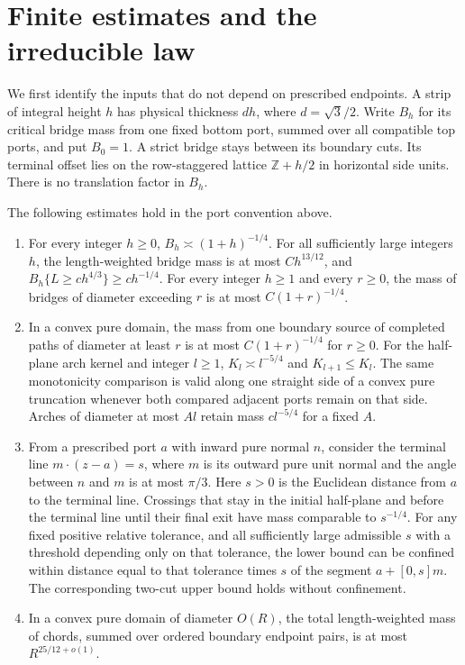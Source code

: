 \section{Finite estimates and the irreducible law}\label{c:inputs}
We first identify the inputs that do not depend on prescribed endpoints.
A strip of integral height $h$ has physical thickness $dh$, where
$d=\sqrt3/2$. Write $B_h$ for its critical bridge mass from one fixed
bottom port, summed over all compatible top ports, and put $B_0=1$.
A strict bridge stays between its boundary cuts. Its terminal offset lies
on the row-staggered lattice $\mathbb Z+h/2$ in horizontal side units.
There is no translation factor in $B_h$.

\begin{proposition}\label{c:finite}
The following estimates hold in the port convention above.
\begin{enumerate}
\item For every integer $h\ge0$, $B_h\asymp(1+h)^{-1/4}$.
For all sufficiently large integers $h$, the length-weighted
bridge mass is at most $Ch^{13/12}$, and
$B_h\{L\ge ch^{4/3}\}\ge ch^{-1/4}$.
For every integer $h\ge1$ and every $r\ge0$, the mass of
bridges of diameter exceeding $r$ is at most $C(1+r)^{-1/4}$.
\item In a convex pure domain, the mass from one boundary source of
completed paths of diameter at least $r$ is at most $C(1+r)^{-1/4}$
for $r\ge0$.
For the half-plane arch kernel and integer $l\ge1$,
$K_l\asymp l^{-5/4}$ and $K_{l+1}\le K_l$.
The same monotonicity comparison is valid along one straight side
of a convex pure truncation whenever both compared adjacent ports
remain on that side. Arches of diameter at most
$Al$ retain mass $cl^{-5/4}$ for a fixed $A$.
\item From a prescribed port $a$ with inward pure normal $n$, consider
the terminal line $m\cdot(z-a)=s$, where $m$ is its outward pure unit
normal and the angle between $n$ and $m$ is at most $\pi/3$.
Here $s>0$ is the Euclidean distance from $a$ to the terminal line.
Crossings that stay in the initial half-plane and before the terminal
line until their final exit have mass comparable to $s^{-1/4}$.
For any fixed positive relative tolerance, and all sufficiently large
admissible $s$ with a threshold depending only on that tolerance, the lower
bound can be confined within distance equal to that tolerance times $s$
of the segment $a+[0,s]m$. The corresponding two-cut upper
bound holds without confinement.
\item In a convex pure domain of diameter $O(R)$, the total
length-weighted mass of chords, summed over ordered boundary endpoint
pairs, is at most $R^{25/12+o(1)}$.
\end{enumerate}
\end{proposition}
